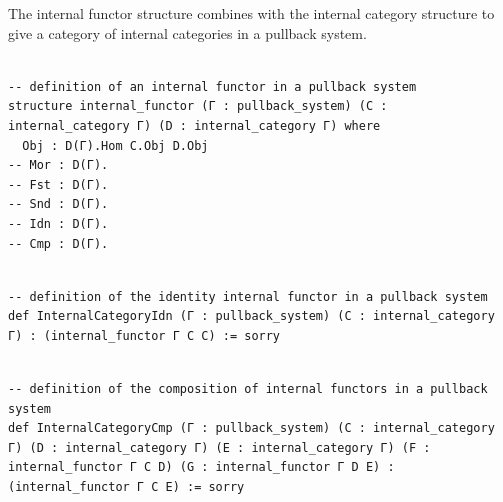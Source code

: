 \documentclass{book}
\theoremstyle{definition}
\newcounter{lcounter}
\begin{document}
The internal functor structure combines with the internal category structure to give a category of internal categories in a pullback system.\\

\begin{center}
\begin{tcolorbox}[width=5in,colback={white},title={\begin{center}\texttt{Lean \thelcounter} \addtocounter{lcounter}{1}  \end{center}},colbacktitle=Blue,coltitle=black]
\begin{verbatim}

-- definition of an internal functor in a pullback system
structure internal_functor (Γ : pullback_system) (C : internal_category Γ) (D : internal_category Γ) where
  Obj : D(Γ).Hom C.Obj D.Obj
-- Mor : D(Γ).
-- Fst : D(Γ).
-- Snd : D(Γ).
-- Idn : D(Γ).
-- Cmp : D(Γ).

\end{verbatim}
\end{tcolorbox}
\end{center}


\begin{center}
\begin{tcolorbox}[width=5in,colback={white},title={\begin{center}\texttt{Lean \thelcounter} \addtocounter{lcounter}{1}  \end{center}},colbacktitle=Blue,coltitle=black]
\begin{verbatim}

-- definition of the identity internal functor in a pullback system
def InternalCategoryIdn (Γ : pullback_system) (C : internal_category Γ) : (internal_functor Γ C C) := sorry

\end{verbatim}
\end{tcolorbox}
\end{center}

\begin{center}
\begin{tcolorbox}[width=5in,colback={white},title={\begin{center}\texttt{Lean \thelcounter} \addtocounter{lcounter}{1}  \end{center}},colbacktitle=Blue,coltitle=black]
\begin{verbatim}

-- definition of the composition of internal functors in a pullback system
def InternalCategoryCmp (Γ : pullback_system) (C : internal_category Γ) (D : internal_category Γ) (E : internal_category Γ) (F : internal_functor Γ C D) (G : internal_functor Γ D E) : (internal_functor Γ C E) := sorry

\end{verbatim}
\end{tcolorbox}
\end{center}
\end{document}
